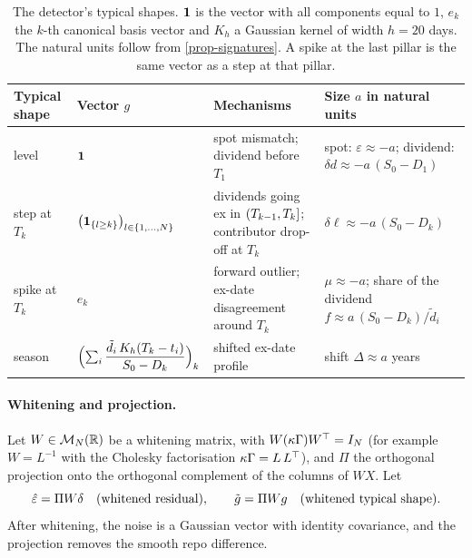 \begin{table}[ht]
\centering
\caption{The detector's typical shapes. $\mathbf{1}$ is the vector with all components equal to $1$, $e_k$ the $k$-th
canonical basis vector and $K_h$ a Gaussian kernel of width $h=20$ days. The natural units follow from
\cref{prop-signatures}. A spike at the last pillar is the same vector as a step at that pillar.}
\label{tab-templates}
\small
\begin{tabular}{@{}>{\raggedright\arraybackslash}p{1.9cm}>{\raggedright\arraybackslash}p{3.6cm}
>{\raggedright\arraybackslash}p{4.2cm}>{\raggedright\arraybackslash}p{4.0cm}@{}}
\toprule
Typical shape & Vector $g$ & Mechanisms & Size $a$ in natural units\\
\midrule
level & $\mathbf{1}$ & spot mismatch; dividend before $T_1$ & spot: $\varepsilon\approx-a$;
dividend: $\delta d\approx-a\,(S_0-D_1)$\\
step at $T_k$ & $\bigl(\mathbf{1}_{\{l\ge k\}}\bigr)_{l\in\{1,\dots,N\}}$ & dividends going ex in $\mathopen{(}T_{k-1}, T_k\mathclose{]}$;
contributor drop-off at $T_k$ & $\delta\ell\approx-a\,(S_0-D_k)$\\
spike at $T_k$ & $e_k$ & forward outlier; ex-date disagreement around $T_k$ & $\mu\approx-a$; share of the dividend
$f\approx a\,(S_0-D_k)/\tilde d_i$\\
season & $\Bigl(\sum_i\dfrac{\tilde d_i\,K_h(T_k-t_i)}{S_0-D_k}\Bigr)_k$ & shifted ex-date profile & shift
$\Delta\approx a$ years\\
\bottomrule
\end{tabular}
\end{table}

\paragraph{Whitening and projection.} Let $W\in\mathcal{M}_N(\mathbb{R})$ be a whitening matrix, with $W(\kappa\Gamma){W}^{\top}=I_N$ (for
example $W=L^{-1}$ with the Cholesky factorisation $\kappa\Gamma=L\,{L}^{\top}$), and $\Pi$ the orthogonal projection onto
the orthogonal complement of the columns of $WX$. Let
\[
\hat\varepsilon=\Pi W\delta\quad\text{(whitened residual)}, \qquad\tilde g=\Pi Wg\quad\text{(whitened typical shape)}.
\]
After whitening, the noise is a Gaussian vector with identity covariance, and the projection removes the smooth repo
difference.

